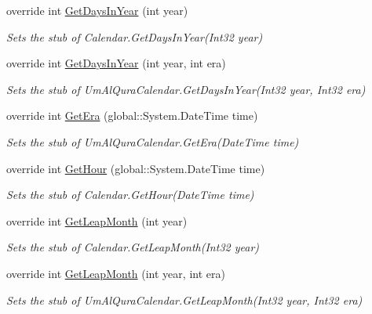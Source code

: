 \begin{DoxyCompactItemize}
override int \hyperlink{class_system_1_1_globalization_1_1_fakes_1_1_stub_um_al_qura_calendar_aeb72fc635100ea53a8e033f875ac8ba7}{Get\-Days\-In\-Year} (int year)
\begin{DoxyCompactList}\small\item\em Sets the stub of Calendar.\-Get\-Days\-In\-Year(\-Int32 year)\end{DoxyCompactList}\item 
override int \hyperlink{class_system_1_1_globalization_1_1_fakes_1_1_stub_um_al_qura_calendar_aa440bd441958d90a5b6c83cbfe385536}{Get\-Days\-In\-Year} (int year, int era)
\begin{DoxyCompactList}\small\item\em Sets the stub of Um\-Al\-Qura\-Calendar.\-Get\-Days\-In\-Year(\-Int32 year, Int32 era)\end{DoxyCompactList}\item 
override int \hyperlink{class_system_1_1_globalization_1_1_fakes_1_1_stub_um_al_qura_calendar_a6198c3c3725751d2d03ce17d5d8cd64c}{Get\-Era} (global\-::\-System.\-Date\-Time time)
\begin{DoxyCompactList}\small\item\em Sets the stub of Um\-Al\-Qura\-Calendar.\-Get\-Era(\-Date\-Time time)\end{DoxyCompactList}\item 
override int \hyperlink{class_system_1_1_globalization_1_1_fakes_1_1_stub_um_al_qura_calendar_aa3e8ec6f9750e8c0897947e9ea19b320}{Get\-Hour} (global\-::\-System.\-Date\-Time time)
\begin{DoxyCompactList}\small\item\em Sets the stub of Calendar.\-Get\-Hour(\-Date\-Time time)\end{DoxyCompactList}\item 
override int \hyperlink{class_system_1_1_globalization_1_1_fakes_1_1_stub_um_al_qura_calendar_aad365f74c34e4e58d90980e16d7a57ee}{Get\-Leap\-Month} (int year)
\begin{DoxyCompactList}\small\item\em Sets the stub of Calendar.\-Get\-Leap\-Month(\-Int32 year)\end{DoxyCompactList}\item 
override int \hyperlink{class_system_1_1_globalization_1_1_fakes_1_1_stub_um_al_qura_calendar_a5820663cdda981ff8a45770e55fb6fdb}{Get\-Leap\-Month} (int year, int era)
\begin{DoxyCompactList}\small\item\em Sets the stub of Um\-Al\-Qura\-Calendar.\-Get\-Leap\-Month(\-Int32 year, Int32 era)\end{DoxyCompactList}\item 

\end{DoxyCompactItemize}
